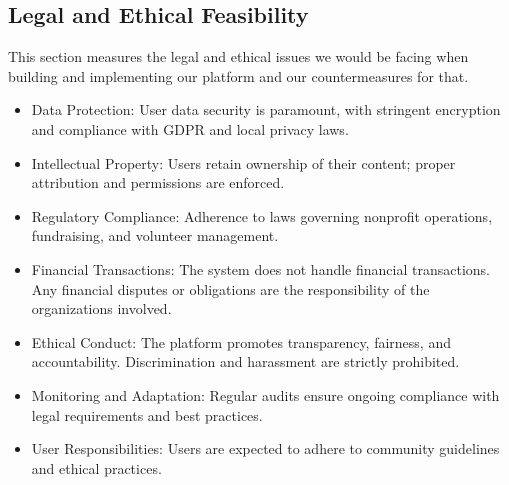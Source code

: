 \subsection{Legal and Ethical Feasibility}
This section measures the legal and ethical issues we would be facing when building and implementing our platform and our countermeasures for that.
\begin{itemize}
    \item Data Protection: User data security is paramount, with stringent encryption and compliance with GDPR and local privacy laws.
    \item Intellectual Property: Users retain ownership of their content; proper attribution and permissions are enforced.
    \item Regulatory Compliance: Adherence to laws governing nonprofit operations, fundraising, and volunteer management.
    \item Financial Transactions: The system does not handle financial transactions. Any financial disputes or obligations are the responsibility of the organizations involved.
    \item Ethical Conduct: The platform promotes transparency, fairness, and accountability. Discrimination and harassment are strictly prohibited.
    \item Monitoring and Adaptation: Regular audits ensure ongoing compliance with legal requirements and best practices.
    \item User Responsibilities: Users are expected to adhere to community guidelines and ethical practices.
    
\end{itemize}